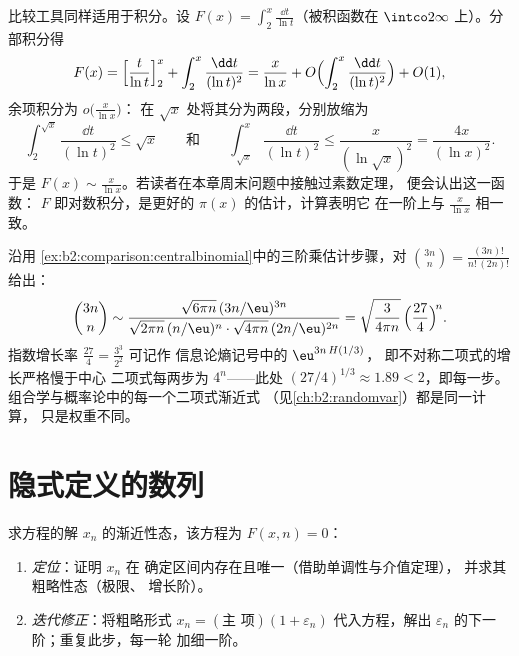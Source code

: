 \begin{example}\label{ex:b2:comparison:liworked}
比较工具同样适用于积分。设 $F(x) =
\int_2^x\frac{\dd t}{\ln t}$（被积函数在
$\intco2\infty$ 上）。分部积分得
\[
F(x) = \Bigl[\frac{t}{\ln t}\Bigr]_2^x +
\int_2^x\frac{\dd t}{(\ln t)^2}
= \frac{x}{\ln x} + O\Bigl(\int_2^x\frac{\dd t}{(\ln
t)^2}\Bigr) + O(1),
\]
余项积分为 $o\bigl(\frac{x}{\ln x}\bigr)$：
在 $\sqrt x$ 处将其分为两段，分别放缩为
\[
\int_2^{\sqrt x}\frac{\dd t}{(\ln t)^2} \leq \sqrt x
\qquad\text{和}\qquad
\int_{\sqrt x}^{x}\frac{\dd t}{(\ln t)^2} \leq
\frac{x}{(\ln\sqrt x)^2} = \frac{4x}{(\ln x)^2} .
\]
于是 $F(x) \sim \frac{x}{\ln x}$。若读者在本章周末问题中接触过素数定理，
便会认出这一函数：
$F$ 即对数积分，是更好的
$\pi(x)$ 的估计，计算表明它
在一阶上与 $\frac{x}{\ln x}$ 相一致。
\end{example}

\begin{example}[斯特林公式用于不对称二项式系数]\label{ex:b2:comparison:lopsided}
沿用
\cref{ex:b2:comparison:centralbinomial}中的三阶乘估计步骤，对
$\binom{3n}{n} = \frac{(3n)!}{n!\,(2n)!}$ 给出：
\[
\binom{3n}{n} \sim
\frac{\sqrt{6\pi n}\,(3n/\eu)^{3n}}
{\sqrt{2\pi n}\,(n/\eu)^{n}\cdot\sqrt{4\pi n}\,(2n/\eu)^{2n}}
= \sqrt{\frac{3}{4\pi n}}\,
\Bigl(\frac{27}{4}\Bigr)^{\!n} .
\]
指数增长率 $\frac{27}4 = \frac{3^3}{2^2}$ 可记作
信息论熵记号中的 $\eu^{3n\,H(1/3)}$，
即不对称二项式的增长严格慢于中心
二项式每两步为 $4^n$——此处 $(27/4)^{1/3} \approx 1.89 < 2$，即每一步。
组合学与概率论中的每一个二项式渐近式
（见\cref{ch:b2:randomvar}）都是同一计算，
只是权重不同。
\end{example}

\section{隐式定义的数列}

\begin{method}\label{met:b2:comparison:implicit}
求方程的解 $x_n$ 的渐近性态，该方程为 $F(x, n) =
0$：
\begin{enumerate}
  \item \emph{定位}：证明 $x_n$ 在
        确定区间内存在且唯一（借助单调性与介值定理），
        并求其粗略性态（极限、
        增长阶）。
  \item \emph{迭代修正}：将粗略形式 $x_n = (\text{主
        项})(1 + \varepsilon_n)$ 代入方程，解出
        $\varepsilon_n$ 的下一阶；重复此步，每一轮
        加细一阶。
\end{enumerate}
\end{method}

